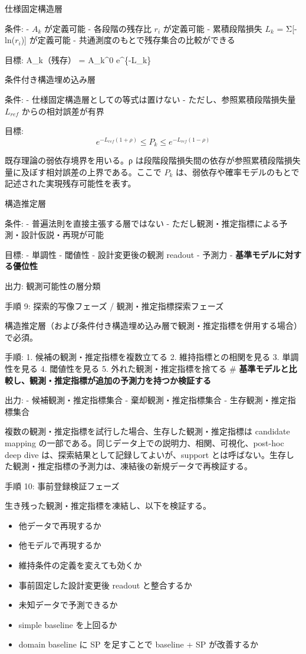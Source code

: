 \documentclass[12pt,a4paper]{article}
\begin{document}
仕様固定構造層

条件: - \(A_{k}\) が定義可能 - 各段階の残存比 \(r_{i}\) が定義可能 - 累積段階損失 \(L_{k}\) = Σ{[}-ln(\(r_{i}\)){]} が定義可能 - 共通測度のもとで残存集合の比較ができる

目標: \textbar A\_k（残存）\textbar{} = \textbar A\_k\^{}0\textbar{} e\^{}\{-L\_k\}

条件付き構造埋め込み層

条件: - 仕様固定構造層としての等式は置けない - ただし、参照累積段階損失量 \(L_{ref}\) からの相対誤差が有界

目標: \[
e^{-L_{ref}(1+\rho)} \le P_{k} \le e^{-L_{ref}(1-\rho)}
\]

既存理論の弱依存境界を用いる。ρ は段階段階損失間の依存が参照累積段階損失量に及ぼす相対誤差の上界である。ここで \(P_{k}\) は、弱依存や確率モデルのもとで記述された実現残存可能性を表す。

構造推定層

条件: - 普遍法則を直接主張する層ではない - ただし観測・推定指標による予測・設計仮説・再現が可能

目標: - 単調性 - 閾値性 - 設計変更後の観測 readout - 予測力 - \textbf{基準モデルに対する優位性}

出力: 観測可能性の層分類

手順 9: 探索的写像フェーズ / 観測・推定指標探索フェーズ

構造推定層（および条件付き構造埋め込み層で観測・推定指標を併用する場合）で必須。

手順: 1. 候補の観測・推定指標を複数立てる 2. 維持指標との相関を見る 3. 単調性を見る 4. 閾値性を見る 5. 外れた観測・推定指標を捨てる \# \textbf{基準モデルと比較し、観測・推定指標が追加の予測力を持つか検証する}

出力: - 候補観測・推定指標集合 - 棄却観測・推定指標集合 - 生存観測・推定指標集合

複数の観測・推定指標を試行した場合、生存した観測・推定指標は candidate mapping の一部である。同じデータ上での説明力、相関、可視化、post-hoc deep dive は、探索結果として記録してよいが、support とは呼ばない。生存した観測・推定指標の予測力は、凍結後の新規データで再検証する。

手順 10: 事前登録検証フェーズ

生き残った観測・推定指標を凍結し、以下を検証する。

\begin{itemize}
\tightlist
\item
  他データで再現するか
\item
  他モデルで再現するか
\item
  維持条件の定義を変えても効くか
\item
  事前固定した設計変更後 readout と整合するか
\item
  未知データで予測できるか
\item
  simple baseline を上回るか
\item
  domain baseline に SP を足すことで baseline + SP が改善するか
\end{itemize}
\end{document}
